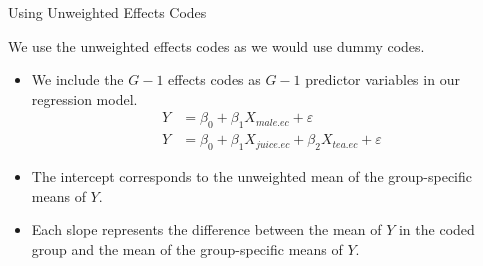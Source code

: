 \documentclass{beamer}\usepackage[]{graphicx}\usepackage[]{color}
\begin{document}
\watermarkon %

\begin{frame}{Using Unweighted Effects Codes}
  
  We use the unweighted effects codes as we would use dummy codes.
  \vc
  \begin{itemize}
  \item We include the $G - 1$ effects codes as $G - 1$ predictor variables in 
    our regression model.
    \begin{align*}
      Y &= \beta_0 + \beta_1 X_{male.ec} + \varepsilon\\[6pt]
      Y &= \beta_0 + \beta_1 X_{juice.ec} + \beta_2 X_{tea.ec} + \varepsilon
    \end{align*}
  \item The intercept corresponds to the unweighted mean of the group-specific 
    means of $Y$.
    \vc
  \item Each slope represents the difference between the mean of $Y$ in the 
    coded group and the mean of the group-specific means of $Y$.
  \end{itemize}
  
\end{frame}

\watermarkoff %
\end{document}

